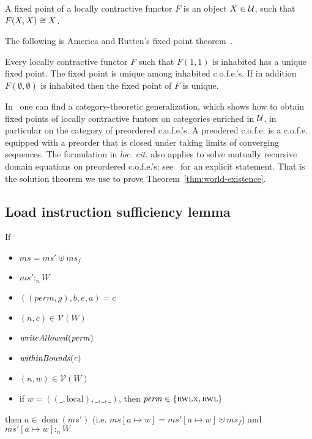 \documentclass[format=acmsmall, review=true, screen=true]{acmart}
\newcommand{\update}[2]{[#1 \mapsto #2]}
\DeclareMathOperator{\dom}{dom}
\newcommand{\var}[1]{\mathit{#1}}
\newcommand{\hs}{\var{ms}}
\newcommand{\ms}{\hs}
\newcommand{\gl}{\var{g}}
\newcommand{\addr}{\var{a}}
\newcommand{\start}{\var{b}}
\newcommand{\addrend}{\var{e}}
\newcommand{\heap}{\var{mem}}
\newcommand{\perm}{\var{perm}}
\newcommand{\plainfun}[2]{
  \ifthenelse{\equal{#2}{}}
  {\mathit{#1}}
  {\mathit{#1}(#2)}
}
\newcommand{\writeAllowed}[1]{\plainfun{writeAllowed}{#1}}
\newcommand{\withinBounds}[1]{\plainfun{withinBounds}{#1}}
\newcommand{\heapSat}[3][\heap]{#1 :_{#2} #3}
\newcommand{\asmType}{\plaindom{AsmType}}
\newcommand{\plaindom}[1]{\mathrm{#1}}
\newcommand{\intr}[2]{\mathcal{#1}}
\newcommand{\valueintr}[1]{\intr{V}{#1}}
\newcommand{\stdvr}{\valueintr{\asmType}}
\newcommand{\npair}[2][n]{\left(#1,#2 \right)}
\newcommand{\plainperm}[1]{\textsc{#1}}
\newcommand{\readwritel}{\plainperm{rwl}}
\newcommand{\rwlx}{\plainperm{rwlx}}
\newcommand{\plainlocality}[1]{\mathrm{#1}}
\newcommand{\local}{\plainlocality{local}}
\begin{document}
\begin{definition}
 \label{def:fixed-point}
 A fixed point of a locally contractive functor $F$ is an object $X \in \mathcal{U}$, such that
 $F(X, X) \cong X$.
\end{definition}

The following is America and Rutten's fixed point theorem~\citep{America-Rutten:JCSS89}.
\begin{theorem}
 \label{thm:contr-functors-have-fixed-points}
 Every locally contractive functor $F$ such that $F(1, 1)$ is inhabited has a unique fixed
 point. The fixed point is unique among inhabited c.o.f.e.'s.
 If in addition $F(\emptyset, \emptyset)$ is inhabited then the fixed point of $F$ is unique.
\end{theorem}
In~\citet{BirkedalL:metric-enriched-journal} one can find a
category-theoretic generalization, which shows how to obtain fixed
points of locally contractive funtors on categories enriched in $\mathcal{U}$,
in particular on the category of preordered c.o.f.e.'s.  A preodered c.o.f.e. is
a c.o.f.e. equipped with a preorder that is closed under taking limits of
converging sequences.
The formulation in \emph{loc. cit.} also applies to solve
mutually recursive domain equations on preordered c.o.f.e.'s; see~\citet{bizjak:mutually-recursive-mcat}
for an explicit statement. That is the solution theorem we use to prove
Theorem~\ref{thm:world-existence}.



\subsection{Load instruction sufficiency lemma}
 \begin{lemma}
   \label{lem:conds-store-suff}
   If 
   \begin{itemize}
   \item $\ms = \ms' \uplus \ms_f$
   \item $\heapSat[\ms']{n}{W}$
   \item $((\perm,\gl),\start,\addrend,\addr) = c$
   \item $\npair{c}\in\stdvr(W)$
   \item $\writeAllowed{\perm}$
   \item $\withinBounds{\var{c}}$
   \item $\npair{\var{w}}\in\stdvr(W)$
   \item if $\var{w} = ((\_,\local),\_,\_,\_)$, then $\perm \in
     \{\rwlx,\readwritel \}$
   \end{itemize}
 
   then $\addr \in \dom(\ms')$ (i.e. $\ms\update{a}{w} =
   \ms'\update{a}{w}\uplus\ms_f$) and
   $\heapSat[{\ms'\update{\addr}{\var{w}}}]{n}{W}$
 \end{lemma}
\end{document}
